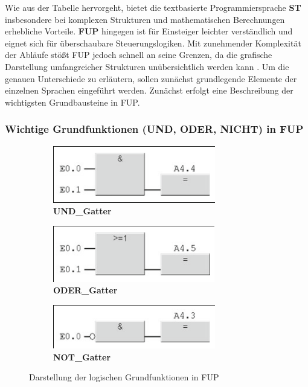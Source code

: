 Wie aus der Tabelle hervorgeht, bietet die textbasierte Programmiersprache \textbf{ST} insbesondere bei komplexen Strukturen und mathematischen Berechnungen erhebliche Vorteile.  
\textbf{FUP} hingegen ist für Einsteiger leichter verständlich und eignet sich für überschaubare Steuerungslogiken.  
Mit zunehmender Komplexität der Abläufe stößt FUP jedoch schnell an seine Grenzen, da die grafische Darstellung umfangreicher Strukturen unübersichtlich werden kann \cite{siemens_programmieren}.  
Um die genauen Unterschiede zu erläutern, sollen zunächst grundlegende Elemente der einzelnen Sprachen eingeführt werden.  
Zunächst erfolgt eine Beschreibung der wichtigsten Grundbausteine in FUP.

\subsubsection*{Wichtige Grundfunktionen (UND, ODER, NICHT) in FUP}
\begin{figure}[H]
	\centering
	\begin{subfigure}[b]{0.49\textwidth}
		\centering
		\includegraphics[width=0.8\linewidth]{images/UND_GATTER}
		\caption{\textbf{UND\_Gatter} \cite{Hering}}
	\end{subfigure}
	\hfill
	\begin{subfigure}[b]{0.49\textwidth}
		\centering
		\includegraphics[width=0.8\linewidth]{images/ODER_GATTER}
		\caption{\textbf{ODER\_Gatter} \cite{Hering}}
	\end{subfigure}
	
	\vspace{1cm}
	
	\begin{subfigure}[b]{0.49\textwidth}
		\centering
		\includegraphics[width=0.8\linewidth]{images/NOT_GATTER}
		\caption{\textbf{NOT\_Gatter} \cite{Hering}}
	\end{subfigure}
	\caption{Darstellung der logischen Grundfunktionen in FUP}
	\label{fig:grundfunktionen_fup}
\end{figure}

